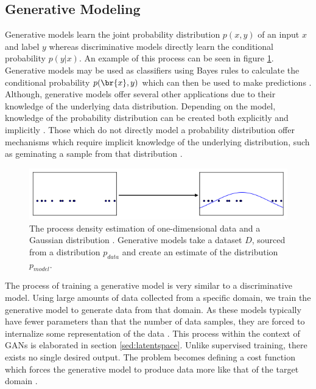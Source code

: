 \documentclass[11pt]{article}
\begin{document}
\subsection{Generative Modeling}
Generative models learn the joint probability distribution $p(x,y)$ of an input $x$ and label $y$ whereas discriminative models directly learn the conditional probability $p(y|x)$. An example of this process can be seen in figure \ref{fig:pdf}. Generative models may be used as classifiers using Bayes rules to calculate the conditional probability $p(\br{x},y)$ which can then be used to make predictions \citep{NIPS2001_2020}. Although, generative models offer several other applications due to their knowledge of the underlying data distribution. Depending on the model, knowledge of the probability distribution can be created both explicitly and implicitly \citep{Goodfellow-et-al-2016}. Those which do not directly model a probability distribution offer mechanisms which require implicit knowledge of the underlying distribution, such as geminating a sample from that distribution \citep{Goodfellow-et-al-2016}.

\begin{figure}
\centering
\includegraphics[scale=0.7]{pdf}
\caption{The process density estimation of one-dimensional data and a Gaussian distribution \citep{2017arXiv170100160G}. Generative models take a dataset $D$, sourced from a distribution $p_{data}$ and create an estimate of the distribution $p_{model}$.}
\label{fig:pdf}
\end{figure}

The process of training a generative model is very similar to a discriminative model. Using large amounts of data collected from a specific domain, we train the generative model to generate data from that domain. As these models typically have fewer parameters than that the number of data samples, they are forced to internalize some representation of the data \citep{genmodelingopenai}. This process within the context of GANs is elaborated in section \ref{sed:latentspace}. Unlike supervised training, there exists no single desired output. The problem becomes defining a cost function which forces the generative model to produce data more like that of the target domain \citep{genmodelingopenai}.
\end{document}
